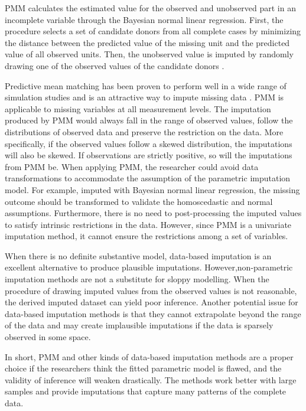 PMM calculates the estimated value for the observed and unobserved part in an incomplete variable through the Bayesian normal linear regression. First, the procedure selects a set of candidate donors from all complete cases by minimizing the distance between the predicted value of the missing unit and the predicted value of all observed units. Then, the unobserved value is imputed by randomly drawing one of the observed values of the candidate donors \citep{Buuren2018}.

Predictive mean matching has been proven to perform well in a wide range of simulation studies and is an attractive way to impute missing data \citep{Buuren2011, Heitjan1991, Morris2014, Vink2014, Vink2015}. PMM is applicable to missing variables at all measurement levels. The imputation produced by PMM would always fall in the range of observed values, follow the distributions of observed data and preserve the restriction on the data. More specifically, if the observed values follow a skewed distribution, the imputations will also be skewed. If observations are strictly positive, so will the imputations from PMM be. When applying PMM, the researcher could avoid data transformations to accommodate the assumption of the parametric imputation model. For example, imputed with Bayesian normal linear regression, the missing outcome should be transformed to validate the homoscedastic and normal assumptions. Furthermore, there is no need to post-processing the imputed values to satisfy intrinsic restrictions in the data. However, since PMM is a univariate imputation method, it cannot ensure the restrictions among a set of variables. 

When there is no definite substantive model, data-based imputation is an excellent alternative to produce plausible imputations. However,non-parametric imputation methods are not a substitute for sloppy modelling. When the procedure of drawing imputed values from the observed values is not reasonable, the derived imputed dataset can yield poor inference. Another potential issue for data-based imputation methods is that they cannot extrapolate beyond the range of the data and may create implausible imputations if the data is sparsely observed in some space. 

In short, PMM and other kinds of data-based imputation methods are a proper choice if the researchers think the fitted parametric model is flawed, and the validity of inference will weaken drastically. The methods work better with large samples and provide imputations that capture many patterns of the complete data. 

